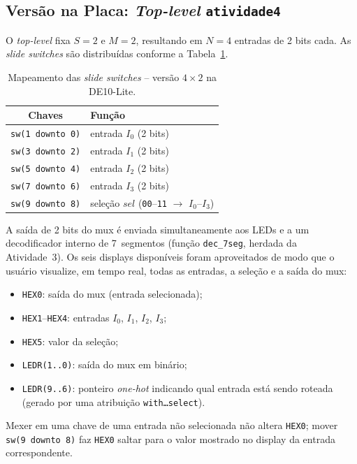 \documentclass[12pt,a4paper, brazil]{article}
\begin{document}
\subsection{Versão na Placa: \textit{Top-level} \texttt{atividade4}}

O \textit{top-level} fixa $S = 2$ e $M = 2$, resultando em $N = 4$ entradas de 2 bits cada. As \textit{slide switches} são distribuídas conforme a Tabela~\ref{tab:mapeamento-sw}.

\begin{table}[H]
\centering
\caption{Mapeamento das \textit{slide switches} -- versão $4{\times}2$ na DE10-Lite.}
\label{tab:mapeamento-sw}
\begin{tabular}{@{}cl@{}}
\toprule
\textbf{Chaves} & \textbf{Função} \\
\midrule
\texttt{sw(1 downto 0)} & entrada $I_0$ (2 bits) \\
\texttt{sw(3 downto 2)} & entrada $I_1$ (2 bits) \\
\texttt{sw(5 downto 4)} & entrada $I_2$ (2 bits) \\
\texttt{sw(7 downto 6)} & entrada $I_3$ (2 bits) \\
\texttt{sw(9 downto 8)} & seleção $sel$ (\texttt{00}--\texttt{11} $\rightarrow$ $I_0$--$I_3$) \\
\bottomrule
\end{tabular}
\end{table}
\FloatBarrier

A saída de 2 bits do mux é enviada simultaneamente aos LEDs e a um decodificador interno de 7~segmentos (função \texttt{dec\_7seg}, herdada da Atividade~3). Os seis displays disponíveis foram aproveitados de modo que o usuário visualize, em tempo real, todas as entradas, a seleção e a saída do mux:

\begin{itemize}
    \item \texttt{HEX0}: saída do mux (entrada selecionada);
    \item \texttt{HEX1}--\texttt{HEX4}: entradas $I_0$, $I_1$, $I_2$, $I_3$;
    \item \texttt{HEX5}: valor da seleção;
    \item \texttt{LEDR(1..0)}: saída do mux em binário;
    \item \texttt{LEDR(9..6)}: ponteiro \textit{one-hot} indicando qual entrada está sendo roteada (gerado por uma atribuição \texttt{with\ldots select}).
\end{itemize}

Mexer em uma chave de uma entrada não selecionada não altera \texttt{HEX0}; mover \texttt{sw(9 downto 8)} faz \texttt{HEX0} saltar para o valor mostrado no display da entrada correspondente.
\end{document}
